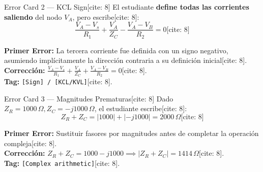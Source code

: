 \documentclass[aspectratio=169]{beamer}
\begin{document}
\begin{frame}{Error Card 2 — KCL Sign[cite: 8]}
    El estudiante \textbf{define todas las corrientes saliendo} del nodo $V_A$, pero escribe[cite: 8]:
    \begin{equation*}
        \frac{V_A - V_s}{R_1} + \frac{V_A}{Z_C} - \frac{V_A - V_B}{R_2} = 0 \text{[cite: 8]}
    \end{equation*}

    \vspace{0.3cm}
    \pause
    \begin{tcolorbox}[colback=red!5, colframe=red!70!black, title=\textbf{Diagnóstico}, width=\linewidth]
        \textbf{Primer Error:} La tercera corriente fue definida con un signo negativo, asumiendo implícitamente la dirección contraria a su definición inicial[cite: 8]. \\
        \textbf{Corrección:} $ \frac{V_A - V_s}{R_1} + \frac{V_A}{Z_C} + \frac{V_A - V_B}{R_2} = 0 $[cite: 8]. \\
        \textbf{Tag:} \texttt{[Sign] / [KCL/KVL]}[cite: 8].
    \end{tcolorbox}
\end{frame}

\begin{frame}{Error Card 3 — Magnitudes Prematuras[cite: 8]}
    Dado $Z_R = 1000\,\Omega, Z_C = -j1000\,\Omega$, el estudiante escribe[cite: 8]:
    \begin{equation*}
        Z_R + Z_C = |1000| + |-j1000| = 2000\,\Omega \text{[cite: 8]}
    \end{equation*}

    \vspace{0.3cm}
    \pause
    \begin{tcolorbox}[colback=red!5, colframe=red!70!black, title=\textbf{Diagnóstico}, width=\linewidth]
        \textbf{Primer Error:} Sustituir fasores por magnitudes antes de completar la operación compleja[cite: 8]. \\
        \textbf{Corrección:} $Z_R + Z_C = 1000 - j1000 \implies |Z_R + Z_C| = 1414\,\Omega$[cite: 8]. \\
        \textbf{Tag:} \texttt{[Complex arithmetic]}[cite: 8].
    \end{tcolorbox}
\end{frame}
\end{document}
